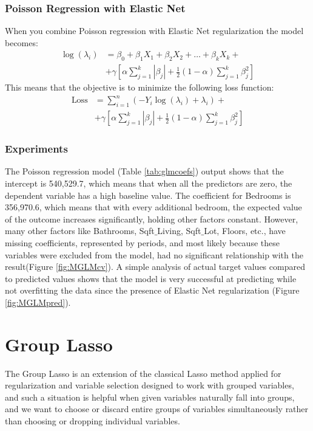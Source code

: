 \documentclass[a4paper, 12pt]{article}
\begin{document}
\begin{multicols}{2}
\subsubsection*{Poisson Regression with Elastic Net}
When you combine Poisson regression with Elastic Net regularization the model becomes:
\begin{equation}
\begin{split}
\log(\lambda_i)&=\beta_0+\beta_1X_1+\beta_2X_2+\dots+\beta_kX_k+ \\
&+\gamma \left[\alpha \sum_{j=1}^k|\beta_j| + \frac{1}{2}(1-\alpha)\sum_{j=1}^k\beta_{j}^{2} \right]
\end{split}
\end{equation}
This means that the objective is to minimize the following loss function:
\begin{equation*}
\begin{split}
\text{Loss}&=\sum_{i=1}^n(-Y_i \log(\lambda_i)+ \lambda_i) + \\
&+ \gamma \left[\alpha \sum_{j=1}^k|\beta_j| + \frac{1}{2}(1-\alpha)\sum_{j=1}^k\beta_{j}^{2} \right]
\end{split}
\end{equation*}

\subsubsection*{Experiments}
The Poisson regression model (Table \ref{tab:glmcoefs}) output shows that the intercept is 540,529.7, which means that when all the predictors are zero, the dependent variable has a high baseline value. The coefficient for Bedrooms is 356,970.6, which means that with every additional bedroom, the expected value of the outcome increases significantly, holding other factors constant. However, many other factors like Bathrooms, Sqft$\_$Living, Sqft$\_$Lot, Floors, etc., have missing coefficients, represented by periods, and most likely because these variables were excluded from the model, had no significant relationship with the result(Figure \ref{fig:MGLMcv}). A simple analysis of actual target values compared to predicted values shows that the model is very successful at predicting while not overfitting the data since the presence of Elastic Net regularization (Figure \ref{fig:MGLMpred}).

\section{Group Lasso} \vspace{-7pt}
The Group Lasso is an extension of the classical Lasso method applied for regularization and variable selection designed to work with grouped variables, and such a situation is helpful when given variables naturally fall into groups, and we want to choose or discard entire groups of variables simultaneously rather than choosing or dropping individual variables.


\end{multicols}
\end{document}
